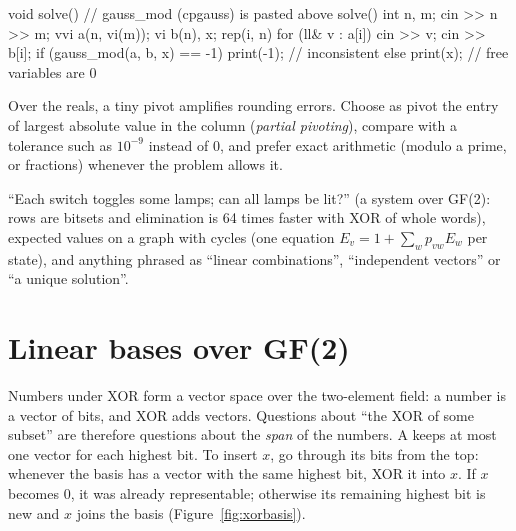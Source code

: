 \begin{code}
void solve() {  // gauss_mod (cpgauss) is pasted above solve()
    int n, m;
    cin >> n >> m;
    vvi a(n, vi(m));
    vi b(n), x;
    rep(i, n) {
        for (ll& v : a[i]) cin >> v;
        cin >> b[i];
    }
    if (gauss_mod(a, b, x) == -1) print(-1);  // inconsistent
    else print(x);  // free variables are 0
}
\end{code}

\begin{pitfall}
Over the reals, a tiny pivot amplifies rounding errors. Choose as pivot the entry of largest absolute value in the column (\emph{partial
pivoting}), compare with a tolerance such as $10^{-9}$ instead of 0, and prefer exact arithmetic (modulo a prime, or fractions) whenever
the problem allows it.
\end{pitfall}

\begin{recognize}
``Each switch toggles some lamps; can all lamps be lit?'' (a system over GF(2): rows are bitsets and elimination is 64 times faster with
XOR of whole words), expected values on a graph with cycles (one equation $E_v = 1 + \sum_w p_{vw} E_w$ per state), and anything phrased
as ``linear combinations'', ``independent vectors'' or ``a unique solution''.
\end{recognize}

\section[Linear bases over GF(2)]{Linear bases over GF(2) \hfill \ioi}\label{sec:xorbasis}

Numbers under XOR form a vector space over the two-element field: a number is a vector of bits, and XOR adds vectors. Questions about
``the XOR of some subset'' are therefore questions about the \emph{span} of the numbers. A  keeps at most one vector
for each highest bit. To insert $x$, go through its bits from the top: whenever the basis has a vector with the same highest bit, XOR it
into $x$. If $x$ becomes 0, it was already representable; otherwise its remaining highest bit is new and $x$ joins the basis
(Figure~\ref{fig:xorbasis}).

